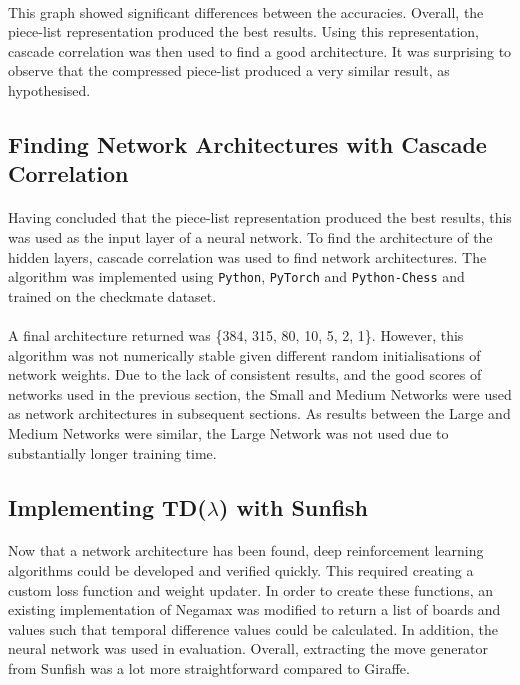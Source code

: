 \documentclass[12pt,a4paper]{book}
\begin{document}
\paragraph{} This graph showed significant differences between the accuracies. Overall, the piece-list representation produced the best results. Using this representation, cascade correlation was then used to find a good architecture. It was surprising to observe that the compressed piece-list produced a very similar result, as hypothesised.

\subsection{Finding Network Architectures with Cascade Correlation}

\paragraph{} Having concluded that the piece-list representation produced the best results, this was used as the input layer of a neural network. To find the architecture of the hidden layers, cascade correlation was used to find network architectures. The algorithm was implemented using \texttt{Python}, \texttt{PyTorch} and \texttt{Python-Chess} and trained on the checkmate dataset.

\paragraph{} A final architecture returned was \{384, 315, 80, 10, 5, 2, 1\}. However, this algorithm was not numerically stable given different random initialisations of network weights. Due to the lack of consistent results, and the good scores of networks used in the previous section, the Small and Medium Networks were used as network architectures in subsequent sections. As results between the Large and Medium Networks were similar, the Large Network was not used due to substantially longer training time.

\subsection{Implementing TD($\lambda$) with Sunfish}

\paragraph{} Now that a network architecture has been found, deep reinforcement learning algorithms could be developed and verified quickly. This required creating a custom loss function and weight updater. In order to create these functions, an existing implementation of Negamax was modified to return a list of boards and values such that temporal difference values could be calculated. In addition, the neural network was used in evaluation. Overall, extracting the move generator from Sunfish was a lot more straightforward compared to Giraffe.
\end{document}
